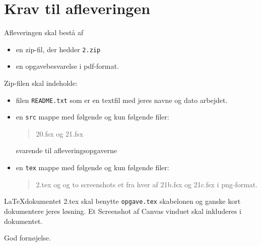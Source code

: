 \documentclass[a4paper,12pt]{article}
\newcommand{\exerciseNumber}{2}
\begin{document}
\section*{Krav til afleveringen}
Afleveringen skal bestå af
\begin{itemize}
  \item en zip-fil, der hedder \texttt{\exerciseNumber\typeLetter.zip}
  \item en opgavebesvarelse i pdf-format.
\end{itemize}
Zip-filen skal indeholde:
\begin{itemize}
\item filen \texttt{README.txt} som er en textfil med jeres navne og dato arbejdet.
\item en \texttt{src} mappe med følgende og kun
  følgende filer:
  \begin{quote}
    \exerciseNumber\typeLetter0.fsx og \exerciseNumber\typeLetter1.fsx
  \end{quote}
  svarende til afleveringsopgaverne
\item en \texttt{tex} mappe med følgende og kun følgende filer:
  \begin{quote}
    \exerciseNumber\typeLetter.tex og og to screenshots et fra hver af \exerciseNumber\typeLetter1b.fsx og \exerciseNumber\typeLetter1c.fsx i png-format.
  \end{quote}
\end{itemize}
\LaTeX dokumentet \exerciseNumber\typeLetter.tex skal benytte \lstinline[language=console]{opgave.tex} skabelonen og ganske kort dokumentere jeres løsning. Et Screenshot af Canvas vinduet skal inkluderes i dokumentet.




\handinTextTwoTwo{\exerciseNumber\typeLetter}{\texttt{\exerciseNumber\typeLetter
    0.fsx og \exerciseNumber\typeLetter 1.fsx}}

\flushright God fornøjelse.
\end{document}
